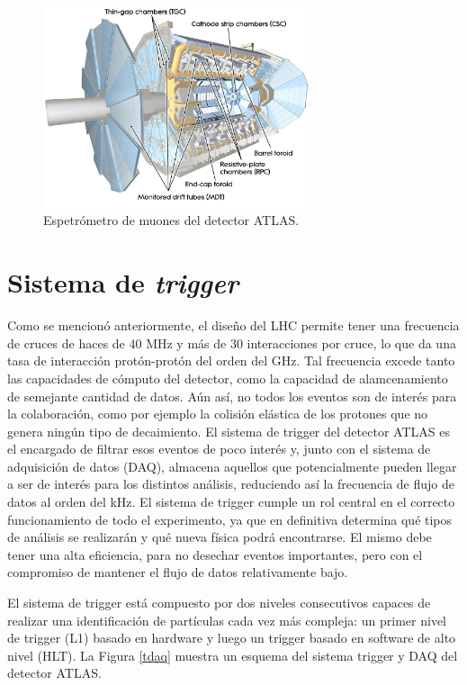 \begin{figure}
  \centering
  \includegraphics[width=0.7\textwidth]{images/muon_1.jpg}
  \caption{Espetrómetro de muones del detector ATLAS.}
  \label{muon_1}
\end{figure}

\section{Sistema de \textit{trigger}}
\label{trigger}

Como se mencionó anteriormente, el diseño del LHC permite tener una frecuencia de cruces de haces de 40 MHz y más de 30 
interacciones por cruce, lo que da una tasa de interacción protón-protón del orden del GHz. Tal frecuencia excede tanto las capacidades de cómputo del detector, como la capacidad de alamcenamiento de semejante cantidad de datos. Aún así, no todos los eventos son de interés para la colaboración, como por ejemplo la colisión elástica de los protones que no genera ningún tipo de decaimiento. El sistema de trigger del detector ATLAS \cite{TRIG-2016-01} es el encargado de filtrar esos eventos de poco interés y, junto con el sistema de adquisición de datos (DAQ), almacena aquellos que potencialmente pueden llegar a ser de interés para los distintos análisis, reduciendo así la frecuencia de flujo de datos al orden del kHz. El sistema de trigger cumple un rol central en el correcto funcionamiento de todo el experimento, ya que en definitiva determina qué tipos de análisis se realizarán y qué nueva física podrá encontrarse. El mismo debe tener una alta eficiencia, para no desechar eventos importantes, pero con el compromiso de mantener el flujo de datos relativamente bajo. 

El sistema de trigger está compuesto por dos niveles consecutivos capaces de realizar una identificación de partículas cada vez más compleja: un primer nivel de trigger (L1) basado en hardware y luego un trigger basado en software de alto nivel (HLT). La Figura \ref{tdaq} muestra un esquema del sistema trigger y DAQ del detector ATLAS.

